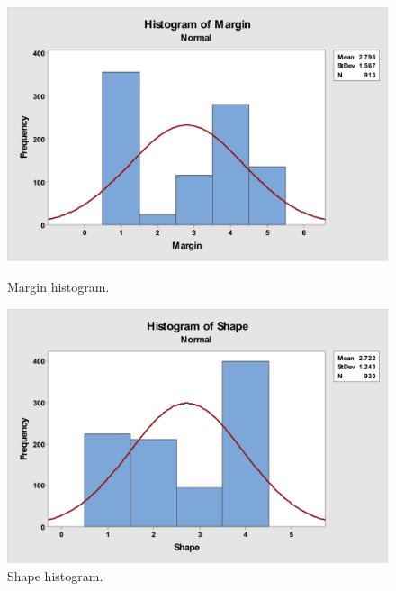 \documentclass[12pt]{article}
\begin{document}
    \begin{figure}[H]
      \centering
      \begin{minipage}[b]{0.45\textwidth}
        \includegraphics[width=\textwidth]{margin-histogram}
        \caption{Margin histogram.}
        \label{fig:margin-histogram}
      \end{minipage}
      \hfill
      \begin{minipage}[b]{0.45\textwidth}
        \includegraphics[width=\textwidth]{shape-histogram}
        \caption{Shape histogram.}
        \label{fig:shape-histogram}
      \end{minipage}
    \end{figure}
\end{document}
